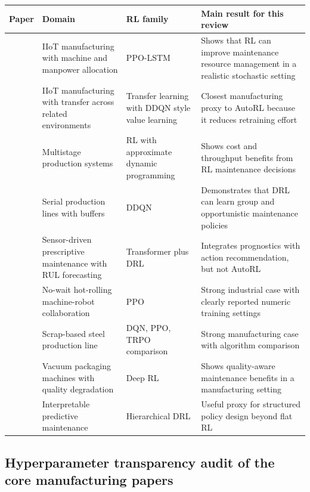 \begin{table}[htbp]
\centering
\small
\begin{tabular}{p{} p{} p{} p{}}
\hline
Paper & Domain & RL family & Main result for this review \\
\hline
[Ong22] & IIoT manufacturing with machine and manpower allocation & PPO-LSTM & Shows that RL can improve maintenance resource management in a realistic stochastic setting \\
[Ong22b] & IIoT manufacturing with transfer across related environments & Transfer learning with DDQN style value learning & Closest manufacturing proxy to AutoRL because it reduces retraining effort \\
[Fen22] & Multistage production systems & RL with approximate dynamic programming & Shows cost and throughput benefits from RL maintenance decisions \\
[Hua20] & Serial production lines with buffers & DDQN & Demonstrates that DRL can learn group and opportunistic maintenance policies \\
[Zha23d] & Sensor-driven prescriptive maintenance with RUL forecasting & Transformer plus DRL & Integrates prognostics with action recommendation, but not AutoRL \\
[Hu24] & No-wait hot-rolling machine-robot collaboration & PPO & Strong industrial case with clearly reported numeric training settings \\
[Net24] & Scrap-based steel production line & DQN, PPO, TRPO comparison & Strong manufacturing case with algorithm comparison \\
[Jim23] & Vacuum packaging machines with quality degradation & Deep RL & Shows quality-aware maintenance benefits in a manufacturing setting \\
[Abb23] & Interpretable predictive maintenance & Hierarchical DRL & Useful proxy for structured policy design beyond flat RL \\
\hline
\end{tabular}
\end{table}

\subsection{Hyperparameter transparency audit of the core manufacturing papers}

